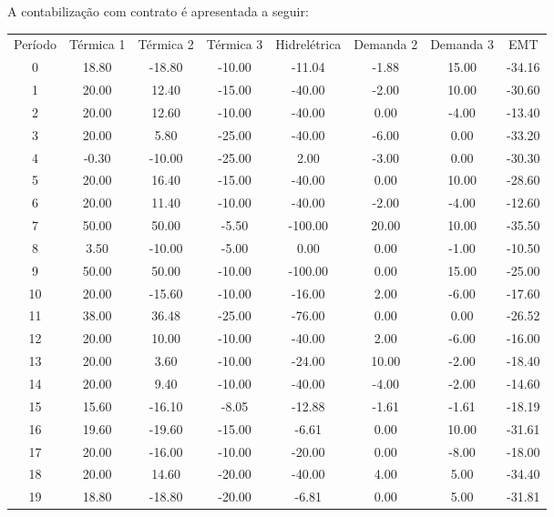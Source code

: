 \documentclass[a4paper,12pt,twoside]{article}
\begin{document}
A contabilização com contrato é apresentada a seguir:
\begin{center}
    \begin{tabular}{ c c c c c c c c }
        Período & Térmica 1  & Térmica 2  & Térmica 3  & Hidrelétrica  & Demanda 2  & Demanda 3 & EMT \\
        0    & 18.80   & -18.80   & -10.00  & -11.04   & -1.88   & 15.00 & -34.16 \\
        1    & 20.00    & 12.40   & -15.00  & -40.00   & -2.00   & 10.00 & -30.60 \\
        2    & 20.00    & 12.60   & -10.00  & -40.00    & 0.00   & -4.00 & -13.40 \\
        3    & 20.00     & 5.80   & -25.00  & -40.00   & -6.00    & 0.00 & -33.20 \\
        4    & -0.30   & -10.00   & -25.00    & 2.00   & -3.00    & 0.00 & -30.30 \\
        5    & 20.00    & 16.40   & -15.00  & -40.00    & 0.00   & 10.00 & -28.60 \\
        6    & 20.00    & 11.40   & -10.00  & -40.00   & -2.00   & -4.00 & -12.60 \\
        7    & 50.00    & 50.00    & -5.50 & -100.00   & 20.00   & 10.00 & -35.50 \\
        8     & 3.50   & -10.00    & -5.00    & 0.00    & 0.00   & -1.00 & -10.50 \\
        9    & 50.00    & 50.00   & -10.00 & -100.00    & 0.00   & 15.00 & -25.00 \\
        10   & 20.00   & -15.60   & -10.00  & -16.00    & 2.00   & -6.00 & -17.60 \\
        11   & 38.00    & 36.48   & -25.00  & -76.00    & 0.00    & 0.00 & -26.52 \\
        12   & 20.00    & 10.00   & -10.00  & -40.00    & 2.00   & -6.00 & -16.00 \\
        13   & 20.00     & 3.60   & -10.00  & -24.00   & 10.00   & -2.00 & -18.40 \\
        14   & 20.00     & 9.40   & -10.00  & -40.00   & -4.00   & -2.00 & -14.60 \\
        15   & 15.60   & -16.10    & -8.05  & -12.88   & -1.61   & -1.61 & -18.19 \\
        16   & 19.60   & -19.60   & -15.00   & -6.61    & 0.00   & 10.00 & -31.61 \\
        17   & 20.00   & -16.00   & -10.00  & -20.00    & 0.00   & -8.00 & -18.00 \\
        18   & 20.00    & 14.60   & -20.00  & -40.00    & 4.00    & 5.00 & -34.40 \\
        19   & 18.80   & -18.80   & -20.00   & -6.81    & 0.00    & 5.00 & -31.81
    \end{tabular}
\end{center}
\end{document}
